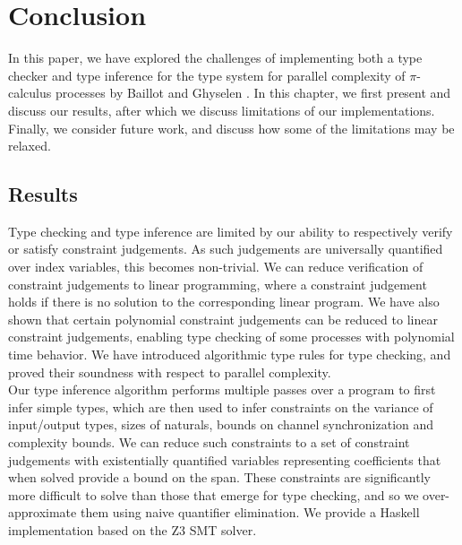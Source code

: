 \section{Conclusion}\label{ch:conclusion}
In this paper, we have explored the challenges of implementing both a type checker and type inference for the type system for parallel complexity of $\pi$-calculus processes by Baillot and Ghyselen \cite{BaillotGhyselen2021}. In this chapter, we first present and discuss our results, after which we discuss limitations of our implementations. Finally, we consider future work, and discuss how some of the limitations may be relaxed.
%
\subsection{Results}
Type checking and type inference are limited by our ability to respectively verify or satisfy constraint judgements. As such judgements are universally quantified over index variables, this becomes non-trivial. We can reduce verification of constraint judgements to linear programming, where a constraint judgement holds if there is no solution to the corresponding linear program. We have also shown that certain polynomial constraint judgements can be reduced to linear constraint judgements, enabling type checking of some processes with polynomial time behavior. We have introduced algorithmic type rules for type checking, and proved their soundness with respect to parallel complexity.\\ %

Our type inference algorithm performs multiple passes over a program to first infer simple types, which are then used to infer constraints on the variance of input/output types, sizes of naturals, bounds on channel synchronization and complexity bounds. We can reduce such constraints to a set of constraint judgements with existentially quantified variables representing coefficients that when solved provide a bound on the span. These constraints are significantly more difficult to solve than those that emerge for type checking, and so we over-approximate them using naive quantifier elimination. We provide a Haskell implementation based on the Z3 SMT solver.\\

